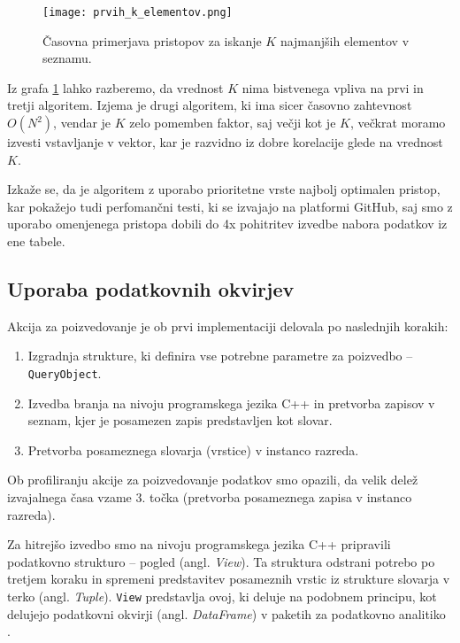 \documentclass[a4paper,12pt,openright]{book}
\begin{document}
        \begin{figure}[H]
            \centerline{\texttt{[image: prvih\_k\_elementov.png]}}
            \caption{Časovna primerjava pristopov za iskanje $K$ najmanjših elementov v seznamu.}
            \label{sl:k_smallest}
        \end{figure}

        \noindent
        Iz grafa \ref{sl:k_smallest} lahko razberemo, da vrednost $K$ nima bistvenega vpliva na prvi in tretji algoritem. Izjema je drugi algoritem, ki ima sicer časovno zahtevnost $O(N^2)$, vendar je $K$ zelo pomemben faktor, saj večji kot je $K$, večkrat moramo izvesti vstavljanje v vektor, kar je razvidno iz dobre korelacije glede na vrednost $K$.

        Izkaže se, da je algoritem z uporabo prioritetne vrste najbolj optimalen pristop, kar pokažejo tudi perfomančni testi, ki se izvajajo na platformi GitHub, saj smo z uporabo omenjenega pristopa dobili do 4x pohitritev izvedbe nabora podatkov iz ene tabele.

        \subsection{Uporaba podatkovnih okvirjev}
        \label{using_df}

        Akcija za poizvedovanje je ob prvi implementaciji delovala po naslednjih korakih:
        \begin{enumerate}
            \item Izgradnja strukture, ki definira vse potrebne parametre za poizvedbo – {\tt QueryObject}.
            \item Izvedba branja na nivoju programskega jezika C++ in pretvorba zapisov v seznam, kjer je posamezen zapis predstavljen kot slovar.
            \item Pretvorba posameznega slovarja (vrstice) v instanco razreda.
        \end{enumerate}

        \noindent
        Ob profiliranju akcije za poizvedovanje podatkov smo opazili, da velik delež izvajalnega časa vzame 3. točka  (pretvorba posameznega zapisa v instanco razreda).

        Za hitrejšo izvedbo smo na nivoju programskega jezika C++ pripravili podatkovno strukturo – pogled (angl. \textit{View}). Ta struktura odstrani potrebo po tretjem koraku in spremeni predstavitev posameznih vrstic iz strukture slovarja v terko (angl. \textit{Tuple}). {\tt View} predstavlja ovoj, ki deluje na podobnem principu, kot delujejo podatkovni okvirji (angl. \textit{DataFrame}) v paketih za podatkovno analitiko \cite{mckinney2010data}.
\end{document}
